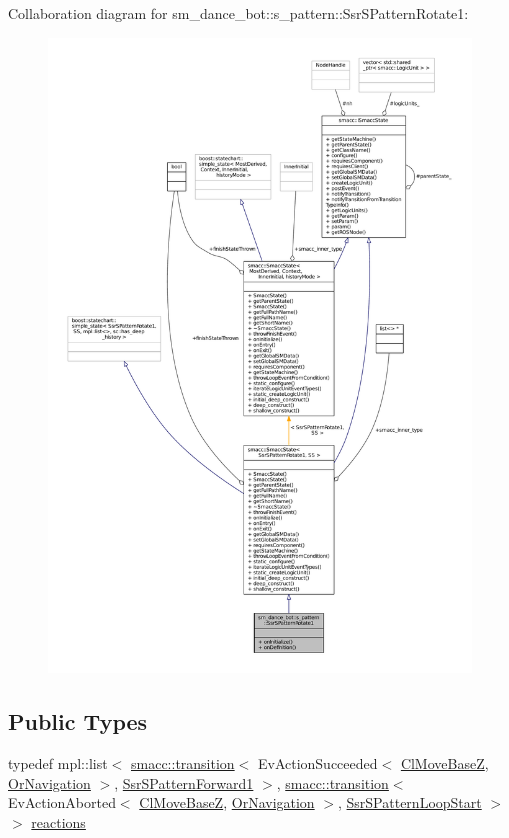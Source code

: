 Collaboration diagram for sm\+\_\+dance\+\_\+bot\+:\+:s\+\_\+pattern\+:\+:Ssr\+S\+Pattern\+Rotate1\+:
\nopagebreak
\begin{figure}[H]
\begin{center}
\leavevmode
\includegraphics[width=350pt]{structsm__dance__bot_1_1s__pattern_1_1SsrSPatternRotate1__coll__graph}
\end{center}
\end{figure}
\subsection*{Public Types}
\begin{DoxyCompactItemize}
\item 
typedef mpl\+::list$<$ \hyperlink{classsmacc_1_1transition}{smacc\+::transition}$<$ Ev\+Action\+Succeeded$<$ \hyperlink{classmove__base__z__client_1_1ClMoveBaseZ}{Cl\+Move\+BaseZ}, \hyperlink{classsm__dance__bot_1_1OrNavigation}{Or\+Navigation} $>$, \hyperlink{structsm__dance__bot_1_1s__pattern_1_1SsrSPatternForward1}{Ssr\+S\+Pattern\+Forward1} $>$, \hyperlink{classsmacc_1_1transition}{smacc\+::transition}$<$ Ev\+Action\+Aborted$<$ \hyperlink{classmove__base__z__client_1_1ClMoveBaseZ}{Cl\+Move\+BaseZ}, \hyperlink{classsm__dance__bot_1_1OrNavigation}{Or\+Navigation} $>$, \hyperlink{structsm__dance__bot_1_1s__pattern_1_1SsrSPatternLoopStart}{Ssr\+S\+Pattern\+Loop\+Start} $>$ $>$ \hyperlink{structsm__dance__bot_1_1s__pattern_1_1SsrSPatternRotate1_af85bb149a542bbfdbd82c2e396d36907}{reactions}
\end{DoxyCompactItemize}
